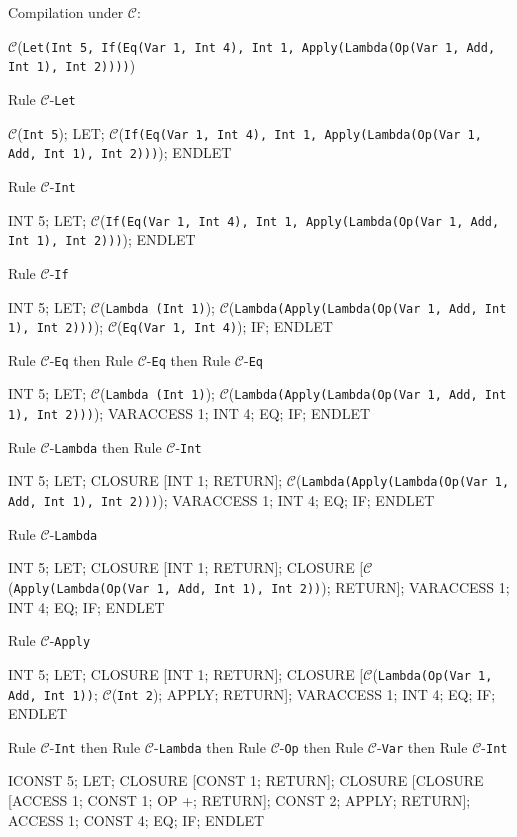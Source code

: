 \documentclass[11pt]{article}
\begin{document}
\begin{landscape}

\noindent Compilation under $\mathcal{C}$:

\bigskip

{\small

\noindent$\mathcal{C}$(\texttt{Let(Int 5, If(Eq(Var 1, Int 4), Int 1, Apply(Lambda(Op(Var 1, Add, Int 1), Int 2))))})

\smallskip
\noindent Rule $\mathcal{C}$-\texttt{Let}
\smallskip

\noindent $\mathcal{C}$(\texttt{Int 5}); LET; $\mathcal{C}$(\texttt{If(Eq(Var 1, Int 4), Int 1, Apply(Lambda(Op(Var 1, Add, Int 1), Int 2)))}); ENDLET

\smallskip
\noindent Rule $\mathcal{C}$-\texttt{Int}
\smallskip

\noindent INT 5; LET; $\mathcal{C}$(\texttt{If(Eq(Var 1, Int 4), Int 1, Apply(Lambda(Op(Var 1, Add, Int 1), Int 2)))}); ENDLET

\smallskip
\noindent Rule $\mathcal{C}$-\texttt{If}
\smallskip

\noindent INT 5; LET; $\mathcal{C}$(\texttt{Lambda (Int 1)}); $\mathcal{C}$(\texttt{Lambda(Apply(Lambda(Op(Var 1, Add, Int 1), Int 2)))}); $\mathcal{C}$(\texttt{Eq(Var 1, Int 4)}); IF; ENDLET


\smallskip
\noindent Rule $\mathcal{C}$-\texttt{Eq} then Rule $\mathcal{C}$-\texttt{Eq} then Rule $\mathcal{C}$-\texttt{Eq}
\smallskip

\noindent INT 5; LET; $\mathcal{C}$(\texttt{Lambda (Int 1)}); $\mathcal{C}$(\texttt{Lambda(Apply(Lambda(Op(Var 1, Add, Int 1), Int 2)))}); VARACCESS 1; INT 4; EQ; IF; ENDLET

\smallskip
\noindent Rule $\mathcal{C}$-\texttt{Lambda} then Rule $\mathcal{C}$-\texttt{Int}
\smallskip

\noindent INT 5; LET; CLOSURE [INT 1; RETURN]; $\mathcal{C}$(\texttt{Lambda(Apply(Lambda(Op(Var 1, Add, Int 1), Int 2)))}); VARACCESS 1; INT 4; EQ; IF; ENDLET

\smallskip
\noindent Rule $\mathcal{C}$-\texttt{Lambda}
\smallskip

\noindent INT 5; LET; CLOSURE [INT 1; RETURN]; CLOSURE [$\mathcal{C}$(\texttt{Apply(Lambda(Op(Var 1, Add, Int 1), Int 2))}); RETURN]; VARACCESS 1; INT 4; EQ; IF; ENDLET

\smallskip
\noindent Rule $\mathcal{C}$-\texttt{Apply}
\smallskip

\noindent INT 5; LET; CLOSURE [INT 1; RETURN]; CLOSURE [$\mathcal{C}$(\texttt{Lambda(Op(Var 1, Add, Int 1))}; $\mathcal{C}$(\texttt{Int 2}); APPLY; RETURN]; VARACCESS 1; INT 4; EQ; IF; ENDLET


\smallskip
\noindent Rule $\mathcal{C}$-\texttt{Int} then Rule $\mathcal{C}$-\texttt{Lambda} then Rule $\mathcal{C}$-\texttt{Op} then Rule $\mathcal{C}$-\texttt{Var} then Rule $\mathcal{C}$-\texttt{Int}
\smallskip

\noindent ICONST 5; LET; CLOSURE [CONST 1; RETURN]; CLOSURE [CLOSURE [ACCESS 1; CONST 1; OP +; RETURN]; CONST 2; APPLY; RETURN]; ACCESS 1; CONST 4; EQ; IF; ENDLET


}\end{landscape}
\end{document}
